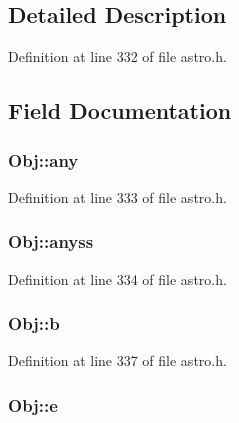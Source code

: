 \subsection{Detailed Description}


Definition at line 332 of file astro.\-h.



\subsection{Field Documentation}
\hypertarget{union_obj_a3be70e47b7e45f1e509c5cb14b0b78ff}{
\subsubsection[{any}]{ Obj\-::any}}\label{union_obj_a3be70e47b7e45f1e509c5cb14b0b78ff}


Definition at line 333 of file astro.\-h.

\hypertarget{union_obj_aa005251ef147fd79203485f59d44839a}{
\subsubsection[{anyss}]{ Obj\-::anyss}}\label{union_obj_aa005251ef147fd79203485f59d44839a}


Definition at line 334 of file astro.\-h.

\hypertarget{union_obj_acb73b50da4a37f11692fc44ef563a227}{
\subsubsection[{b}]{ Obj\-::b}}\label{union_obj_acb73b50da4a37f11692fc44ef563a227}


Definition at line 337 of file astro.\-h.

\hypertarget{union_obj_ad9cbacafcfa52192f9e810aadd170941}{
\subsubsection[{e}]{ Obj\-::e}}\label{union_obj_ad9cbacafcfa52192f9e810aadd170941}


